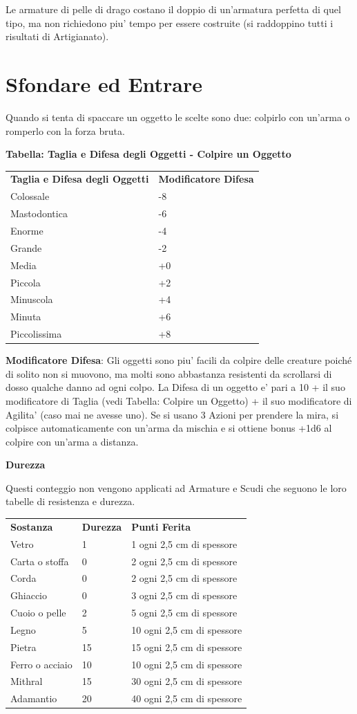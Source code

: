 \documentclass[a4paper,11pt,twoside,openany]{book}
\begin{document}
{Le armature di pelle di drago costano il doppio di un'armatura perfetta di quel tipo, ma non richiedono piu' tempo per essere costruite (si raddoppino tutti i risultati di Artigianato).

\pagebreak

\section{Sfondare ed Entrare}

\label{sfondare-ed-entrare}

Quando si tenta di spaccare un oggetto le scelte sono due: colpirlo con un'arma o romperlo con la forza bruta.

\textbf{Tabella: Taglia e Difesa degli Oggetti - Colpire un Oggetto}
\medskip

\begin{tabular}{ll}
\toprule
\textbf{Taglia e Difesa degli Oggetti} & \textbf{Modificatore Difesa}\tabularnewline
Colossale & -8\tabularnewline
Mastodontica & -6\tabularnewline
Enorme & -4\tabularnewline
Grande & -2\tabularnewline
Media & +0\tabularnewline
Piccola & +2\tabularnewline
Minuscola & +4\tabularnewline
Minuta & +6\tabularnewline
Piccolissima & +8\tabularnewline
\end{tabular}

\bigskip

\textbf{Modificatore Difesa}: Gli oggetti sono piu' facili da colpire delle creature poiché di solito non si muovono, ma molti sono abbastanza resistenti da scrollarsi di dosso qualche danno ad ogni colpo. La Difesa di un oggetto e' pari a 10 + il suo modificatore di Taglia (vedi Tabella: Colpire un Oggetto) + il suo modificatore di Agilita' (caso mai ne avesse uno). Se si usano 3 Azioni per prendere la mira, si colpisce automaticamente con un'arma da mischia e si ottiene bonus +1d6 al colpire con un'arma a distanza.

\textbf{Durezza}

Questi conteggio non vengono applicati ad Armature e Scudi che seguono le loro tabelle di resistenza e durezza.

\bigskip

\begin{tabular}{lll}
\toprule
\textbf{Sostanza} & \textbf{Durezza} & \textbf{Punti Ferita} \tabularnewline
Vetro & 1 & 1 ogni 2,5 cm di spessore\tabularnewline
Carta o stoffa & 0 & 2 ogni 2,5 cm di spessore\tabularnewline
Corda & 0 & 2 ogni 2,5 cm di spessore\tabularnewline
Ghiaccio & 0 & 3 ogni 2,5 cm di spessore\tabularnewline
Cuoio o pelle & 2 & 5 ogni 2,5 cm di spessore\tabularnewline
Legno & 5 & 10 ogni 2,5 cm di spessore\tabularnewline
Pietra & 15 & 15 ogni 2,5 cm di spessore\tabularnewline
Ferro o acciaio & 10 & 10 ogni 2,5 cm di spessore\tabularnewline
Mithral & 15 & 30 ogni 2,5 cm di spessore\tabularnewline
Adamantio & 20 & 40 ogni 2,5 cm di spessore\tabularnewline
\end{tabular}

}
\end{document}
